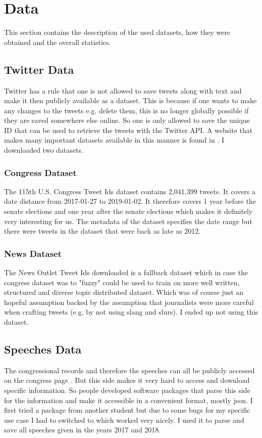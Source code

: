 \documentclass[10pt,conference,compsocconf]{IEEEtran}
\begin{document}
\section{Data}
\label{sec:Data}
This section contains the description of the used datasets, how they were obtained and the overall statistics. 
\subsection{Twitter Data}
Twitter has a rule that one is not allowed to save tweets along with text and make it then publicly available as a dataset. This is because if one wants to make any changes to the tweets e.g. delete them, this is no longer globally possible if they are saved somewhere else online. So one is only allowed to save the unique ID that can be used to retrieve the tweets with the Twitter API. A website that makes many important datasets available in this manner is found in  \cite{twitter_datasets}. I downloaded two datasets.
\subsubsection{Congress Dataset}
The 115th U.S. Congress Tweet Ids dataset contains 2,041,399 tweets. It covers a date distance from 2017-01-27 to 2019-01-02. It therefore covers 1 year before the senate elections and one year after the senate elections which makes it definitely very interesting for us. The metadata of the dataset specifies the date range but there were tweets in the dataset that were back as late as 2012. 
\subsubsection{News Dataset}
The News Outlet Tweet Ids downloaded is a fallback dataset which in case the congress dataset was to "fuzzy" could be used to train on more well written, structured and diverse topic distributed dataset. Which was of course just an hopeful assumption backed by the assumption that journalists were more careful when crafting tweets (e.g. by not using slang and slurs). I ended up not using this dataset. 
\subsection{Speeches Data}
The congressional records and therefore the speeches can all be publicly accessed on the congress page \cite{congress_page}. But this side makes it very hard to access and download specific information. So people developed software packages that parse this side for the information and make it accessible in a convenient format, mostly json. I first tried a package from another student but due to some bugs for my specific use case I had to switched to \cite{congress-downloader} which worked very nicely. I used it to parse and save all speeches given in the years 2017 and 2018.
\end{document}
